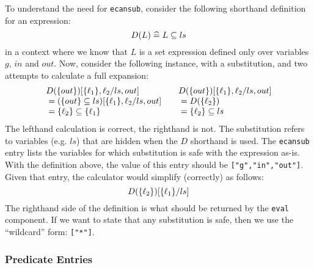 To understand the need for \texttt{ecansub},
consider the following shorthand definition for an expression:
\[
  D(L) \mathrel{\widehat=} L \subseteq ls
\]
in a context where we know that $L$ is a set expression defined
only over variables $g$, $in$ and $out$.
Now, consider the following instance, with a substitution,
and two attempts to calculate a full expansion:
\[\begin{array}{l@{\qquad}l}
   D(\setof{out})[\setof{\ell_1},\ell_2/ls,out]
 & D(\setof{out})[\setof{\ell_1},\ell_2/ls,out]
\\ {} = (\setof{out} \subseteq ls)[\setof{\ell_1},\ell_2/ls,out]
 & {}= D(\setof{\ell_2})
\\ {} = \setof{\ell_2} \subseteq \setof{\ell_1}
 & {} = \setof{\ell_2} \subseteq ls
\end{array}\]
The lefthand calculation is correct, the righthand is not.
The substitution refers to variables (e.g. $ls$)
that are hidden when the $D$ shorthand is used.
The \texttt{ecansub} entry lists the variables for which substitution
is safe with the expression as-is.
With the definition above, the value of this entry
 should be \texttt{["g","in","out"]}.
Given that entry, the calculator would simplify (correctly) as follows:
\[
  D(\{{\ell_2}\})[\{{\ell_1}\}/ls]
\]
The righthand side of the definition is what should be returned
by the \texttt{eval} component.
If we want to state that any substitution is safe,
then we use the ``wildcard'' form: \texttt{["*"]}.


\subsubsection{Predicate Entries}~

